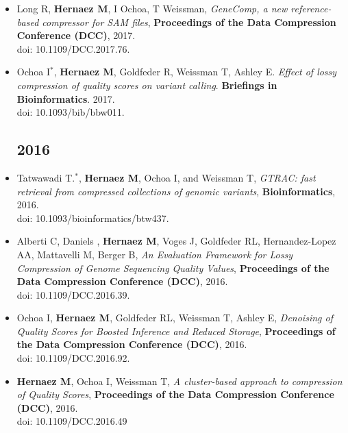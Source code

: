 \documentclass[11pt,a4paper,sans]{moderncv}        %
\begin{document}
\begin{itemize}
\item Long R, \textbf{Hernaez M}, I Ochoa, T Weissman, \textsl{GeneComp, a new reference-based compressor for SAM files}, \textbf{Proceedings of the Data Compression Conference (DCC)}, 2017.\\
doi: 10.1109/DCC.2017.76.\\

\item Ochoa I$^\ast$, \textbf{Hernaez M}, Goldfeder R, Weissman T, Ashley E. \textsl{Effect of lossy compression of quality scores on variant calling}. \textbf{Briefings in Bioinformatics}. 2017. \\
doi: 10.1093/bib/bbw011.\\


\subsection{2016}
\vspace{6pt}

\item Tatwawadi T.$^\ast$, \textbf{Hernaez M}, Ochoa I, and Weissman T, \textsl{GTRAC: fast retrieval from compressed collections of genomic variants}, \textbf{Bioinformatics}, 2016.\\
doi: 10.1093/bioinformatics/btw437.\\

\item Alberti C, Daniels , \textbf{Hernaez M}, Voges J, Goldfeder RL, Hernandez-Lopez AA, Mattavelli M, Berger B, \textsl{An Evaluation Framework for Lossy Compression of Genome Sequencing Quality Values},  \textbf{Proceedings of the Data Compression Conference (DCC)}, 2016. \\
doi: 10.1109/DCC.2016.39.\\

\item Ochoa I, \textbf{Hernaez M}, Goldfeder RL, Weissman T, Ashley E, \textsl{Denoising of Quality Scores for Boosted Inference and Reduced Storage}, \textbf{ Proceedings of the Data Compression Conference (DCC)}, 2016. \\
doi: 10.1109/DCC.2016.92.\\

\item  \textbf{Hernaez M}, Ochoa I, Weissman T, \textsl{A cluster-based approach to compression of Quality Scores}, \textbf{Proceedings of the Data Compression Conference (DCC)}, 2016. \\
doi: 10.1109/DCC.2016.49\\


\end{itemize}
\end{document}
